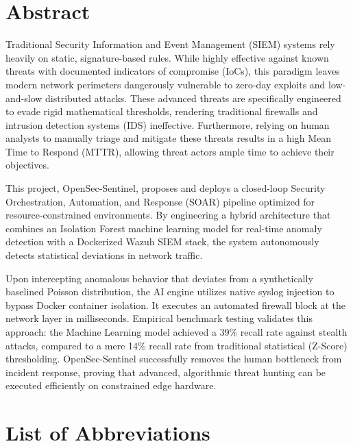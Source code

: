 \documentclass[12pt, a4paper]{report}
\begin{document}
	\chapter*{Abstract}
	\onehalfspacing
	Traditional Security Information and Event Management (SIEM) systems rely heavily on static, signature-based rules. While highly effective against known threats with documented indicators of compromise (IoCs), this paradigm leaves modern network perimeters dangerously vulnerable to zero-day exploits and low-and-slow distributed attacks. These advanced threats are specifically engineered to evade rigid mathematical thresholds, rendering traditional firewalls and intrusion detection systems (IDS) ineffective. Furthermore, relying on human analysts to manually triage and mitigate these threats results in a high Mean Time to Respond (MTTR), allowing threat actors ample time to achieve their objectives.
	
	This project, OpenSec-Sentinel, proposes and deploys a closed-loop Security Orchestration, Automation, and Response (SOAR) pipeline optimized for resource-constrained environments. By engineering a hybrid architecture that combines an Isolation Forest machine learning model for real-time anomaly detection with a Dockerized Wazuh SIEM stack, the system autonomously detects statistical deviations in network traffic. 
	
	Upon intercepting anomalous behavior that deviates from a synthetically baselined Poisson distribution, the AI engine utilizes native syslog injection to bypass Docker container isolation. It executes an automated firewall block at the network layer in milliseconds. Empirical benchmark testing validates this approach: the Machine Learning model achieved a 39\% recall rate against stealth attacks, compared to a mere 14\% recall rate from traditional statistical (Z-Score) thresholding. OpenSec-Sentinel successfully removes the human bottleneck from incident response, proving that advanced, algorithmic threat hunting can be executed efficiently on constrained edge hardware.
	
	\clearpage
	
	\tableofcontents
	\listoftables
	\listoffigures
	\clearpage
	
	\chapter*{List of Abbreviations}
	
\end{document}
